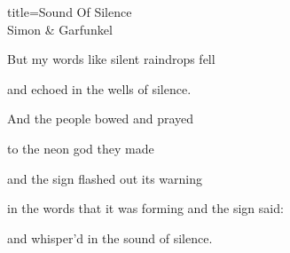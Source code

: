 \begin{song}{title=\centering Sound Of Silence \\\normalsize Simon \& Garfunkel  \vspace*{-0.3cm}}
{   But my words like silent raindrops fell 
   
   and echoed in the wells of silence. 
   
\sloka
   And the people bowed and prayed 
   
   to the neon god they made 
   
   and the sign flashed out its warning 
   
   in the words that it was forming and the sign said: 
   
    and whisper'd in the sound of silence. 
   

}
\setcounter{Slokočet}{0}
\end{song}
